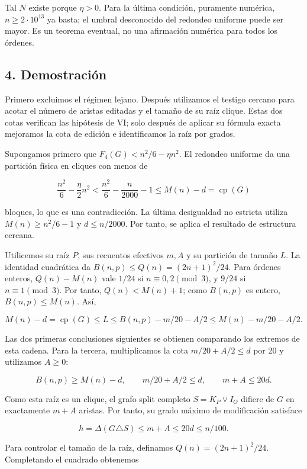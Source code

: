 \documentclass[spanish,11pt,a4paper]{article}
\begin{document}
Tal \(N\) existe porque \(\eta>0\). Para la última condición, puramente
numérica, \(n\ge2\cdot10^{13}\) ya basta; el umbral desconocido del
redondeo uniforme puede ser mayor. Es un teorema eventual, no una
afirmación numérica para todos los órdenes.

\subsection{4. Demostración}\label{demostraciuxf3n}

Primero excluimos el régimen lejano. Después utilizamos el testigo
cercano para acotar el número de aristas editadas y el tamaño de su raíz
clique. Estas dos cotas verifican las hipótesis de VI; solo después de
aplicar su fórmula exacta mejoramos la cota de edición e identificamos
la raíz por grados.

Supongamos primero que \(F_4(G)<n^2/6-\eta n^2\). El redondeo uniforme
da una partición física en cliques con menos de

\[
\frac{n^2}{6}-\frac\eta2n^2
<\frac{n^2}{6}-\frac n{2000}-1
\le M(n)-d=\operatorname{cp}(G)
\]

bloques, lo que es una contradicción. La última desigualdad no estricta
utiliza \(M(n)\ge n^2/6-1\) y \(d\le n/2000\). Por tanto, se aplica el
resultado de estructura cercana.

Utilicemos su raíz \(P\), sus recuentos efectivos \(m,A\) y su partición
de tamaño \(L\). La identidad cuadrática da
\(B(n,p)\le Q(n)=(2n+1)^2/24\). Para órdenes enteros, \(Q(n)-M(n)\) vale
\(1/24\) si \(n\equiv0,2\pmod3\), y \(9/24\) si \(n\equiv1\pmod3\). Por
tanto, \(Q(n)<M(n)+1\); como \(B(n,p)\) es entero, \(B(n,p)\le M(n)\).
Así,

\[
M(n)-d=\operatorname{cp}(G)\le L
\le B(n,p)-m/20-A/2\le M(n)-m/20-A/2.
\]

Las dos primeras conclusiones siguientes se obtienen comparando los
extremos de esta cadena. Para la tercera, multiplicamos la cota
\(m/20+A/2\le d\) por 20 y utilizamos \(A\ge0\):

\[
B(n,p)\ge M(n)-d,\qquad m/20+A/2\le d,
\qquad m+A\le20d.
\tag{7}
\]

Como esta raíz es un clique, el grafo split completo \(S=K_P\vee I_O\)
difiere de \(G\) en exactamente \(m+A\) aristas. Por tanto, su grado
máximo de modificación satisface

\[
h=\Delta(G\triangle S)\le m+A\le20d\le n/100.
\tag{8}
\]

Para controlar el tamaño de la raíz, definamos \(Q(n)=(2n+1)^2/24\).
Completando el cuadrado obtenemos
\end{document}
